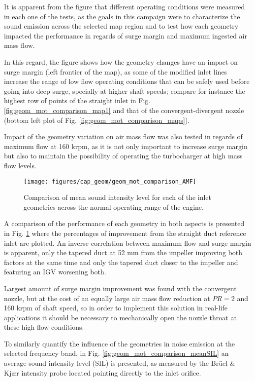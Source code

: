 It is apparent from the figure that different operating conditions were measured in each one of the tests, as the goals in this campaign were to characterize the sound emission across the selected map region and to test how each geometry impacted the performance in regards of surge margin and maximum ingested air mass flow.

In this regard, the figure shows how the geometry changes have an impact on surge margin (left frontier of the map), as some of the modified inlet lines increase the range of low flow operating conditions that can be safely used before going into deep surge, specially at higher shaft speeds; compare for instance the highest row of points of the straight inlet in Fig. \ref{fig:geom_mot_comparison_map1} and that of the convergent-divergent nozzle (bottom left plot of Fig. \ref{fig:geom_mot_comparison_maps}).

Impact of the geometry variation on air mass flow was also tested in regards of maximum flow at 160 krpm, as it is not only important to increase surge margin but also to maintain the possibility of operating the turbocharger at high mass flow levels. 

\begin{figure}[h!]
\centering
\texttt{[image: figures/cap\_geom/geom\_mot\_comparison\_AMF]}
\caption{Comparison of mean sound intensity level for each of the inlet geometries across the normal operating range of the engine.}
\label{fig:geom_mot_comparison_AMF}
\end{figure}

A comparison of the performance of each geometry in both aspects is presented in Fig. \ref{fig:geom_mot_comparison_AMF} where the percentages of improvement from the straight duct reference inlet are plotted. An inverse correlation between maximum flow and surge margin is apparent, only the tapered duct at 52 mm from the impeller improving both factors at the same time and only the tapered duct closer to the impeller and featuring an IGV worsening both.

Largest amount of surge margin improvement was found with the convergent nozzle, but at the cost of an equally large air mass flow reduction at $PR = 2$ and 160 krpm of shaft speed, so in order to implement this solution in real-life applications it should be necessary to mechanically open the nozzle throat at these high flow conditions.

To similarly quantify the influence of the geometries in noise emission at the selected frequency band, in Fig. \ref{fig:geom_mot_comparison_meanSIL} an average sound intensity level (SIL) is presented, as measured by the Brüel \& Kj\ae r intensity probe located pointing directly to the inlet orifice.

